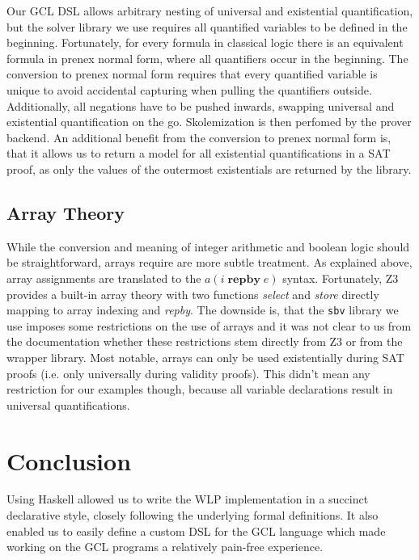\documentclass[]{scrartcl}
\newcommand{\REPBY}[2]{\ensuremath{#1\;\mathbf{repby}\;#2}}
\begin{document}
Our GCL DSL allows arbitrary nesting of universal and existential quantification,
but the solver library we use requires all quantified variables to be defined in
the beginning.
Fortunately, for every formula in classical logic there is an equivalent formula
in prenex normal form, where all quantifiers occur in the beginning.
The conversion to prenex normal form requires that every quantified variable is
unique to avoid accidental capturing when pulling the quantifiers outside.
Additionally, all negations have to be pushed inwards, swapping universal and
existential quantification on the go.
Skolemization is then perfomed by the prover backend.
An additional benefit from the conversion to prenex normal form is, that it allows
us to return a model for all existential quantifications in a SAT proof, as only
the values of the outermost existentials are returned by the library.

\subsection{Array Theory}

While the conversion and meaning of integer arithmetic and boolean logic should be
straightforward, arrays require are more subtle treatment.
As explained above, array assignments are translated to the $a(\REPBY{i}{e})$ syntax.
Fortunately, Z3 provides a built-in array theory with two functions \emph{select} and
\emph{store} directly mapping to array indexing and \emph{repby}.
The downside is, that the \texttt{sbv} library we use imposes some restrictions on the
use of arrays and it was not clear to us from the documentation whether these restrictions
stem directly from Z3 or from the wrapper library.
Most notable, arrays can only be used existentially during SAT proofs (i.e. only universally
during validity proofs).
This didn't mean any restriction for our examples though, because all variable declarations
result in universal quantifications.

\section{Conclusion}

Using Haskell allowed us to write the WLP implementation in a succinct declarative
style, closely following the underlying formal definitions. It also enabled us
to easily define a custom DSL for the GCL language which made working on the GCL
programs a relatively pain-free experience. 
\end{document}
